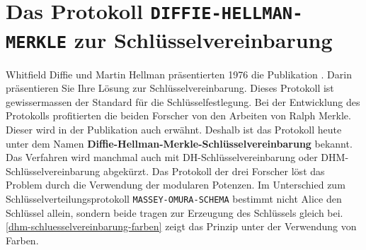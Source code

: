 \newpage

\section{Das Protokoll \texttt{DIFFIE-HELLMAN-MERKLE} zur Schlüsselvereinbarung}

Whitfield Diffie und Martin Hellman präsentierten 1976 die Publikation . Darin präsentieren Sie Ihre Lösung zur Schlüsselvereinbarung. Dieses Protokoll ist gewissermassen der Standard für die Schlüsselfestlegung. Bei der Entwicklung des Protokolls profitierten die beiden Forscher von den Arbeiten von Ralph Merkle. Dieser wird in der Publikation auch erwähnt. Deshalb ist das Protokoll heute unter dem Namen \textbf{Diffie-Hellman-Merkle-Schlüsselvereinbarung} bekannt. Das Verfahren wird manchmal auch mit DH-Schlüsselvereinbarung oder DHM-Schlüsselvereinbarung abgekürzt. Das Protokoll der drei Forscher löst das Problem durch die Verwendung der modularen Potenzen. Im Unterschied zum Schlüsselverteilungsprotokoll \texttt{MASSEY-OMURA-SCHEMA} bestimmt nicht Alice den Schlüssel allein, sondern beide tragen zur Erzeugung des Schlüssels gleich bei. \autoref{dhm-schluesselvereinbarung-farben} zeigt das Prinzip unter der Verwendung von Farben.


